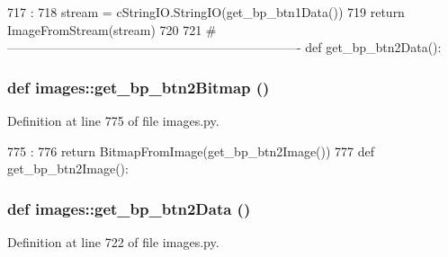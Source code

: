 \begin{DoxyCode}
717                       :
718     stream = cStringIO.StringIO(get_bp_btn1Data())
719     return ImageFromStream(stream)
720 
721 #----------------------------------------------------------------------
def get_bp_btn2Data():
\end{DoxyCode}
\hypertarget{namespaceimages_acb591e076316df58c32d63f603891b92}{
\subsubsection[{get\_\-bp\_\-btn2Bitmap}]{\setlength{\rightskip}{0pt plus 5cm}def images::get\_\-bp\_\-btn2Bitmap ()}}
\label{namespaceimages_acb591e076316df58c32d63f603891b92}


Definition at line 775 of file images.py.


\begin{DoxyCode}
775                        :
776     return BitmapFromImage(get_bp_btn2Image())
777 
def get_bp_btn2Image():
\end{DoxyCode}
\hypertarget{namespaceimages_af4e6b090a70618d97bfa1ca3928ed5e9}{
\subsubsection[{get\_\-bp\_\-btn2Data}]{\setlength{\rightskip}{0pt plus 5cm}def images::get\_\-bp\_\-btn2Data ()}}
\label{namespaceimages_af4e6b090a70618d97bfa1ca3928ed5e9}


Definition at line 722 of file images.py.


